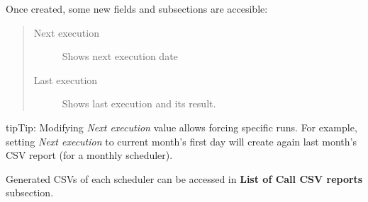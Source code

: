 \documentclass[letterpaper,10pt,english]{sphinxmanual}
\begin{document}
Once created, some new fields and subsections are accesible:
\begin{quote}
\begin{description}
\item[{Next execution}] \leavevmode
Shows next execution date

\item[{Last execution}] \leavevmode
Shows last execution and its result.

\end{description}
\end{quote}

\begin{notice}{tip}{Tip:}
Modifying \emph{Next execution} value allows forcing specific runs. For example, setting \emph{Next execution} to
current month's first day will create again last month's CSV report (for a monthly scheduler).
\end{notice}

Generated CSVs of each scheduler can be accessed in \textbf{List of Call CSV reports} subsection.
\end{document}
